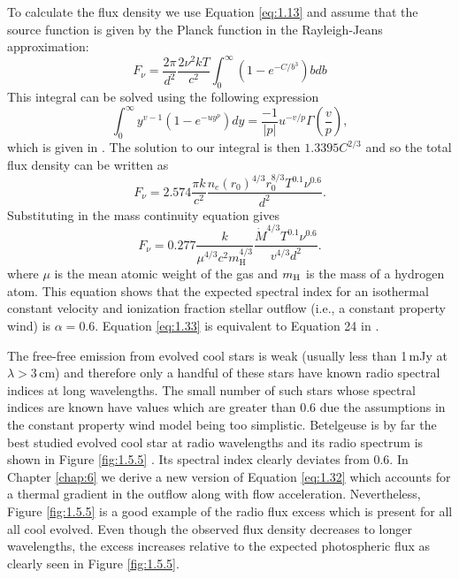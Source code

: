 To calculate the flux density we use Equation \ref{eq:1.13} and assume that the source function is given by the Planck function in the Rayleigh-Jeans approximation:
\begin{equation}
F_{\nu} = \frac{2\pi}{d^2}\frac{2\nu ^2 kT}{c^2} \int ^{\infty} _{0}(1-e^{-C/b^3})bdb
\end{equation}
This integral can be solved using the following expression
\begin{equation}
\int ^{\infty} _{0}y^{v-1}(1-e^{-uy^p})dy=\frac{-1}{|p|}u^{-v/p}\Gamma \left(\frac{v}{p} \right),
\end{equation}
which is given in \cite{gradshteyn_1994}. The solution to our integral is then $1.3395C^{2/3}$ and so the total flux density can be written as 
\begin{equation}\label{eq:1.32}
F_{\nu} = 2.574\frac{\pi k}{c^2}\dfrac{n_e(r_0)^{4/3}r_0^{8/3}T^{0.1}\nu ^{0.6}}{d^2}.
\end{equation}
Substituting in the mass continuity equation gives
\begin{equation}\label{eq:1.33}
F_{\nu} = 0.277\frac{k}{\mu ^{4/3} c^2 m_{\mathrm{H}}^{4/3}}\dfrac{\dot{M}^{4/3}T^{0.1}\nu ^{0.6}}{v^{4/3}d^2}.
\end{equation}
where $\mu$ is the mean atomic weight of the gas and $m_{\rm{H}}$ is the mass of a hydrogen atom. This equation shows that the expected spectral index for an isothermal constant velocity and ionization fraction stellar outflow (i.e., a constant property wind) is $\alpha =0.6$. Equation \ref{eq:1.33} is equivalent to Equation 24 in \cite{panagia_1975}.

The free-free emission from evolved cool stars is weak (usually less than 1\,mJy at $\lambda > 3$\,cm) and therefore only a handful of these stars have known radio spectral indices at long wavelengths. The small number of such stars whose spectral indices are known have values which are greater than 0.6 \citep[e.g.][]{drake_1986} due the assumptions in the constant property wind model being too simplistic. Betelgeuse is by far the best studied evolved cool star at radio wavelengths and its radio spectrum is shown in Figure \ref{fig:1.5.5} \citep{newell_1982}. Its spectral index clearly deviates from 0.6. In Chapter \ref{chap:6} we derive a new version of Equation \ref{eq:1.32} which accounts for a thermal gradient in the outflow along with flow acceleration. Nevertheless, Figure \ref{fig:1.5.5} is a good example of the radio flux excess which is present for all all cool evolved. Even though the observed flux density decreases to longer wavelengths, the excess increases relative to the expected photospheric flux as clearly seen in Figure \ref{fig:1.5.5}.

